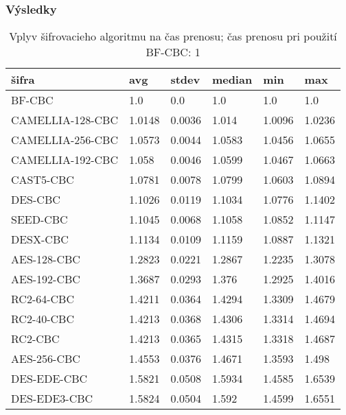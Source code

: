 \documentclass{beamer}
\begin{document}
\begin{frame}
	\frametitle{Výsledky}
	\begin{table}
		\footnotesize 
		\begin{tabular}{|l||l|l|l|l|l|}
			\hline
			\bf šifra & \bf  avg & \bf stdev & \bf median & \bf min & \bf max \\ \hline 
BF-CBC & 1.0 & 0.0 & 1.0 & 1.0 & 1.0\\ \hline
CAMELLIA-128-CBC & 1.0148 & 0.0036 & 1.014 & 1.0096 & 1.0236 \\ \hline
CAMELLIA-256-CBC & 1.0573 & 0.0044 & 1.0583 & 1.0456 & 1.0655 \\ \hline
CAMELLIA-192-CBC & 1.058 & 0.0046 & 1.0599 & 1.0467 & 1.0663 \\ \hline
CAST5-CBC & 1.0781 & 0.0078 & 1.0799 & 1.0603 & 1.0894 \\ \hline
DES-CBC & 1.1026 & 0.0119 & 1.1034 & 1.0776 & 1.1402 \\ \hline
SEED-CBC & 1.1045 & 0.0068 & 1.1058 & 1.0852 & 1.1147 \\ \hline
DESX-CBC & 1.1134 & 0.0109 & 1.1159 & 1.0887 & 1.1321 \\ \hline
AES-128-CBC & 1.2823 & 0.0221 & 1.2867 & 1.2235 & 1.3078 \\ \hline
AES-192-CBC & 1.3687 & 0.0293 & 1.376 & 1.2925 & 1.4016 \\ \hline
RC2-64-CBC & 1.4211 & 0.0364 & 1.4294 & 1.3309 & 1.4679 \\ \hline
RC2-40-CBC & 1.4213 & 0.0368 & 1.4306 & 1.3314 & 1.4694 \\ \hline
RC2-CBC & 1.4213 & 0.0365 & 1.4315 & 1.3318 & 1.4687 \\ \hline
AES-256-CBC & 1.4553 & 0.0376 & 1.4671 & 1.3593 & 1.498 \\ \hline
DES-EDE-CBC & 1.5821 & 0.0508 & 1.5934 & 1.4585 & 1.6539 \\ \hline
DES-EDE3-CBC & 1.5824 & 0.0504 & 1.592 & 1.4599 & 1.6551 \\ \hline
		\end{tabular}
		\caption{Vplyv šifrovacieho algoritmu na čas prenosu; čas prenosu pri použití BF-CBC: 1}
	\end{table}
\end{frame}
\end{document}
